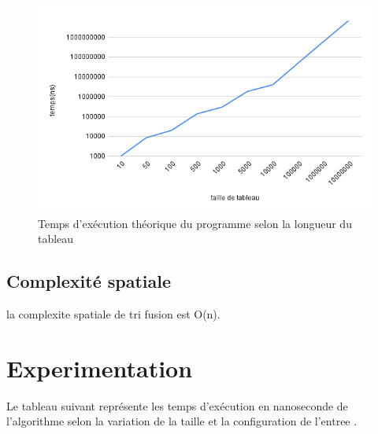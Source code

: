 \begin{figure}[H]
    \centering
        \includegraphics[scale=0.7]{ressources/chartfusiontheorique.png}
        \caption{Temps d'exécution théorique du programme selon la longueur du tableau}
    \label{fig:temps_exec_dico_theo}
\end{figure} 
\subsection{Complexité spatiale}
la complexite spatiale de tri fusion est O(n).
\section{Experimentation}
Le tableau suivant représente les temps d’exécution en nanoseconde de l’algorithme selon la variation de la taille et la configuration de l'entree .
